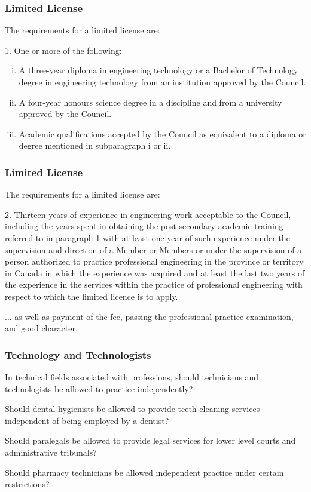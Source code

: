 \begin{frame}
\frametitle{Limited License}

The requirements for a limited license are:

1. One or more of the following:
\begin{enumerate}[i)]
\item A three-year diploma in engineering technology or a Bachelor of Technology degree in engineering technology from an institution approved by the Council.
\item A four-year honours science degree in a discipline and from a university approved by the Council.
\item Academic qualifications accepted by the Council as equivalent to a diploma or degree mentioned in subparagraph i or ii.
\end{enumerate}

\end{frame}

\begin{frame}
\frametitle{Limited License}

The requirements for a limited license are:

2. Thirteen years of experience in engineering work acceptable to the Council, including the years spent in obtaining the post-secondary academic training referred to in paragraph 1 with at least one year of such experience under the supervision and direction of a Member or Members or under the supervision of a person authorized to practice professional engineering in the province or territory in Canada in which the experience was acquired and at least the last two years of the experience in the services within the practice of professional engineering with respect to which the limited licence is to apply.


... as well as payment of the fee, passing the professional practice examination, and good character.

\end{frame}



\begin{frame}
\frametitle{Technology and Technologists}


In technical fields associated with professions, should technicians and technologists be allowed to practice independently?

Should dental hygienists be allowed to provide teeth-cleaning services independent of being employed by a dentist?

Should paralegals be allowed to provide legal services for lower level courts and administrative tribunals?

Should pharmacy technicians be allowed independent practice under certain restrictions?

\end{frame}



